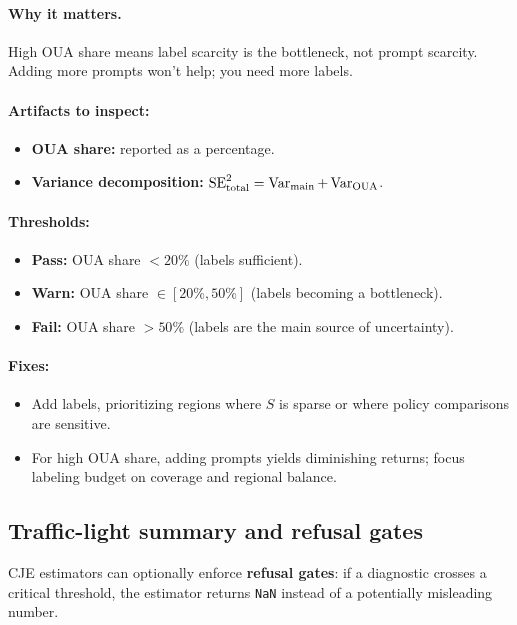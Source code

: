 \paragraph{Why it matters.} High OUA share means label scarcity is the bottleneck, not prompt scarcity. Adding more prompts won't help; you need more labels.

\paragraph{Artifacts to inspect:}
\begin{itemize}
\item \textbf{OUA share:} reported as a percentage.
\item \textbf{Variance decomposition:} $\operatorname{SE}^2_{\text{total}} = \operatorname{Var}_{\text{main}} + \operatorname{Var}_{\text{OUA}}$.
\end{itemize}

\paragraph{Thresholds:}
\begin{itemize}
\item \textbf{Pass:} OUA share $< 20\%$ (labels sufficient).
\item \textbf{Warn:} OUA share $\in [20\%, 50\%]$ (labels becoming a bottleneck).
\item \textbf{Fail:} OUA share $> 50\%$ (labels are the main source of uncertainty).
\end{itemize}

\paragraph{Fixes:}
\begin{itemize}
\item Add labels, prioritizing regions where $S$ is sparse or where policy comparisons are sensitive.
\item For high OUA share, adding prompts yields diminishing returns; focus labeling budget on coverage and regional balance.
\end{itemize}

\subsection{Traffic-light summary and refusal gates}

CJE estimators can optionally enforce \textbf{refusal gates}: if a diagnostic crosses a critical threshold, the estimator returns \texttt{NaN} instead of a potentially misleading number.

